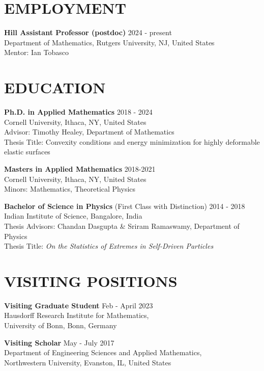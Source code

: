 \documentclass[margin]{res} %
\begin{document}
\begin{resume}

\section{EMPLOYMENT}
\textbf{Hill Assistant Professor (postdoc)} \hfill 2024 - present\\	
Department of Mathematics, Rutgers University, NJ, United States\\
Mentor: Ian Tobasco

\section{EDUCATION}  
\textbf{Ph.D. in Applied Mathematics} \hfill 2018 - 2024\\
Cornell University, Ithaca, NY, United States\\
Advisor: Timothy Healey, Department of Mathematics\\
Thesis Title: Convexity conditions and energy minimization for highly deformable elastic surfaces
\smallskip

\textbf{Masters in Applied Mathematics} \hfill 2018-2021\\
Cornell University, Ithaca, NY, United States\\
Minors: Mathematics, Theoretical Physics
\smallskip

\textbf{Bachelor of Science in Physics} (First Class with Distinction) \hfill 2014 - 2018 \\
Indian Institute of Science, Bangalore, India\\
Thesis Advisors: Chandan Dasgupta \& Sriram Ramaswamy, Department of Physics\\
Thesis Title: \textit{On the Statistics of Extremes in Self-Driven Particles}

\section{VISITING POSITIONS}
\textbf{Visiting Graduate Student} \hfill Feb - April 2023\\
Hausdorff Research Institute for Mathematics,\\
University of Bonn, Bonn, Germany
\smallskip

\textbf{Visiting Scholar} \hfill May - July 2017\\
Department of Engineering Sciences and Applied Mathematics,\\
Northwestern University, Evanston, IL, United States


\end{resume}
\end{document}
